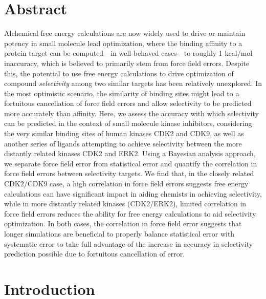\documentclass[phd,tocprelim]{cornell}
\begin{document}
\section{Abstract}
Alchemical free energy calculations are now widely used to drive or maintain potency in small molecule lead optimization, where the binding affinity to a protein target can be computed---in well-behaved cases---to roughly 1 kcal/mol inaccuracy, which is believed to primarily stem from force field errors.
Despite this, the potential to use free energy calculations to drive optimization of compound \emph{selectivity} among two similar targets has been relatively unexplored.
In the most optimistic scenario, the similarity of binding sites might lead to a fortuitous cancellation of force field errors and allow selectivity to be predicted more accurately than affinity.
Here, we assess the accuracy with which selectivity can be predicted in the context of small molecule kinase inhibitors, considering the very similar binding sites of human kinases CDK2 and CDK9, as well as another series of ligands attempting to achieve selectivity between the more distantly related kinases CDK2 and ERK2.
Using a Bayesian analysis approach, we separate force field error from statistical error and quantify the correlation in force field errors between selectivity targets.
We find that, in the closely related CDK2/CDK9 case, a high correlation in force field errors suggests free energy calculations can have significant impact in aiding chemists in achieving selectivity, while in more distantly related kinases (CDK2/ERK2), limited correlation in force field errors reduces the ability for free energy calculations to aid selectivity optimization.
In both cases, the correlation in force field error suggests that longer simulations are beneficial to properly balance statistical error with systematic error to take full advantage of the increase in accuracy in selectivity prediction possible due to fortuitous cancellation of error.

\section{Introduction}
\end{document}
